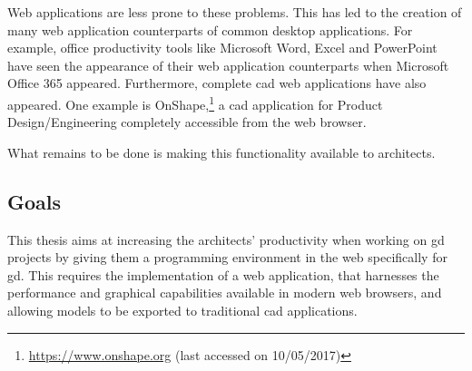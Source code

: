 Web applications are less prone to these problems.
This has led to the creation of many web application counterparts of common desktop applications.
For example, office productivity tools like Microsoft Word, Excel and PowerPoint have seen the appearance of their web application counterparts when Microsoft Office 365 appeared.
Furthermore, complete \gls{cad} web applications have also appeared.
One example is OnShape,\footnote{\url{https://www.onshape.org} (last accessed on 10/05/2017)} a \gls{cad} application for Product Design/Engineering completely accessible from the web browser.

What remains to be done is making this functionality available to architects.


\subsection{Goals}
This thesis aims at increasing the architects' productivity when working on \gls{gd} projects by giving them a programming environment in the web specifically for \gls{gd}.
This requires the implementation of a web application, that harnesses the performance and graphical capabilities available in modern web browsers, and allowing models to be exported to traditional \gls{cad} applications.
